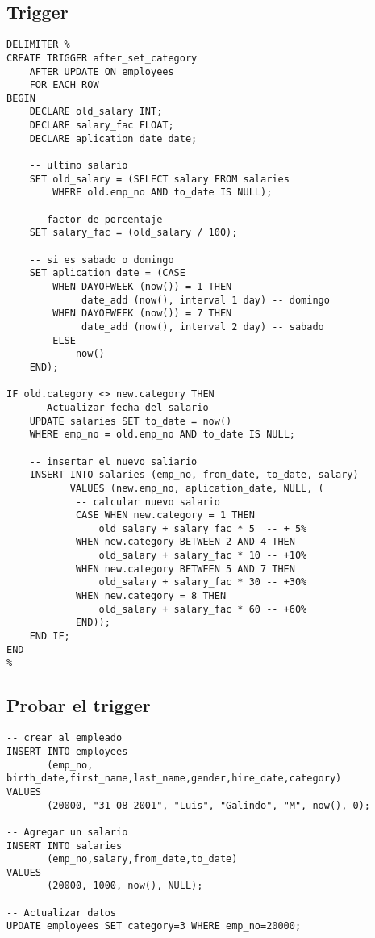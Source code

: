 \documentclass[11pt]{article}
\begin{document}
\subsection{Trigger}
\label{sec:org5f81c8f}
\begin{verbatim}
DELIMITER %
CREATE TRIGGER after_set_category
    AFTER UPDATE ON employees
    FOR EACH ROW
BEGIN
    DECLARE old_salary INT;
    DECLARE salary_fac FLOAT;
    DECLARE aplication_date date;

    -- ultimo salario
    SET old_salary = (SELECT salary FROM salaries
        WHERE old.emp_no AND to_date IS NULL);

    -- factor de porcentaje
    SET salary_fac = (old_salary / 100);

    -- si es sabado o domingo
    SET aplication_date = (CASE
        WHEN DAYOFWEEK (now()) = 1 THEN
             date_add (now(), interval 1 day) -- domingo
        WHEN DAYOFWEEK (now()) = 7 THEN
             date_add (now(), interval 2 day) -- sabado
        ELSE
            now()
    END);

IF old.category <> new.category THEN
    -- Actualizar fecha del salario
    UPDATE salaries SET to_date = now()
    WHERE emp_no = old.emp_no AND to_date IS NULL;

    -- insertar el nuevo saliario
    INSERT INTO salaries (emp_no, from_date, to_date, salary)
           VALUES (new.emp_no, aplication_date, NULL, (
            -- calcular nuevo salario
            CASE WHEN new.category = 1 THEN
                old_salary + salary_fac * 5  -- + 5%
            WHEN new.category BETWEEN 2 AND 4 THEN
                old_salary + salary_fac * 10 -- +10%
            WHEN new.category BETWEEN 5 AND 7 THEN
                old_salary + salary_fac * 30 -- +30%
            WHEN new.category = 8 THEN
                old_salary + salary_fac * 60 -- +60%
            END));
    END IF;
END
%
\end{verbatim}

\subsection{Probar el trigger}
\label{sec:org4964b13}
\begin{verbatim}
-- crear al empleado
INSERT INTO employees
       (emp_no, birth_date,first_name,last_name,gender,hire_date,category)
VALUES 
       (20000, "31-08-2001", "Luis", "Galindo", "M", now(), 0);

-- Agregar un salario 
INSERT INTO salaries
       (emp_no,salary,from_date,to_date) 
VALUES 
       (20000, 1000, now(), NULL);

-- Actualizar datos
UPDATE employees SET category=3 WHERE emp_no=20000;
\end{verbatim}
\end{document}
